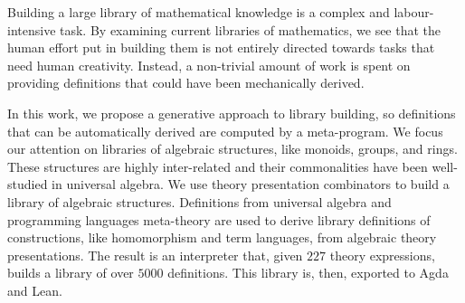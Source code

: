 
Building a large library of mathematical knowledge is a complex and labour-intensive task.
By examining current libraries of mathematics, we see that the human effort put in building them is not entirely directed towards tasks that need human creativity. 
Instead, a non-trivial amount of work is spent on providing definitions that could have been mechanically derived.


In this work, we propose a generative approach to library building, so definitions that can be automatically derived are computed by a meta-program. We focus our attention on libraries of algebraic structures, like monoids, groups, and rings. 
These structures are highly inter-related and their commonalities have been well-studied in universal algebra. We use theory presentation combinators to build a library of algebraic structures. Definitions from universal algebra and programming languages meta-theory are used to derive library definitions of constructions, like homomorphism and term languages, from algebraic theory presentations. The result is an interpreter that, given $227$ theory expressions, builds a library of over $5000$ definitions. This library is, then, exported to Agda and Lean. 





